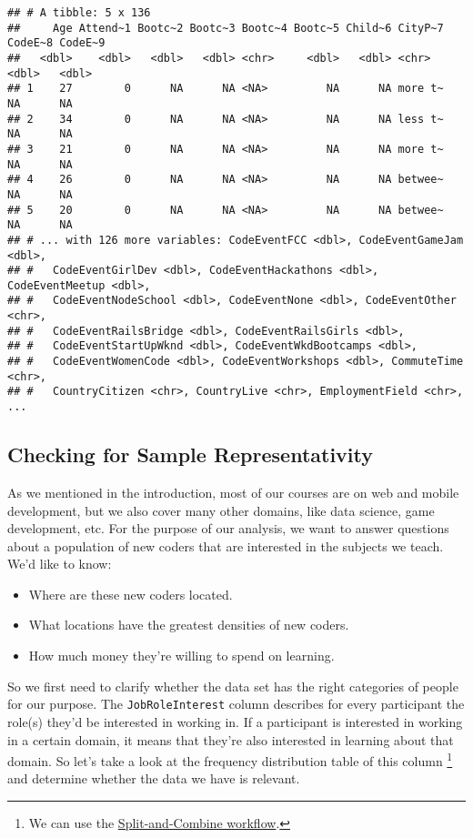 \documentclass[
]{article}
\providecommand{\tightlist}{%
  \setlength{\itemsep}{0pt}\setlength{\parskip}{0pt}}
\begin{document}
\begin{verbatim}
## # A tibble: 5 x 136
##     Age Attend~1 Bootc~2 Bootc~3 Bootc~4 Bootc~5 Child~6 CityP~7 CodeE~8 CodeE~9
##   <dbl>    <dbl>   <dbl>   <dbl> <chr>     <dbl>   <dbl> <chr>     <dbl>   <dbl>
## 1    27        0      NA      NA <NA>         NA      NA more t~      NA      NA
## 2    34        0      NA      NA <NA>         NA      NA less t~      NA      NA
## 3    21        0      NA      NA <NA>         NA      NA more t~      NA      NA
## 4    26        0      NA      NA <NA>         NA      NA betwee~      NA      NA
## 5    20        0      NA      NA <NA>         NA      NA betwee~      NA      NA
## # ... with 126 more variables: CodeEventFCC <dbl>, CodeEventGameJam <dbl>,
## #   CodeEventGirlDev <dbl>, CodeEventHackathons <dbl>, CodeEventMeetup <dbl>,
## #   CodeEventNodeSchool <dbl>, CodeEventNone <dbl>, CodeEventOther <chr>,
## #   CodeEventRailsBridge <dbl>, CodeEventRailsGirls <dbl>,
## #   CodeEventStartUpWknd <dbl>, CodeEventWkdBootcamps <dbl>,
## #   CodeEventWomenCode <dbl>, CodeEventWorkshops <dbl>, CommuteTime <chr>,
## #   CountryCitizen <chr>, CountryLive <chr>, EmploymentField <chr>, ...
\end{verbatim}

\hypertarget{checking-for-sample-representativity}{%
\subsection{Checking for Sample
Representativity}\label{checking-for-sample-representativity}}

As we mentioned in the introduction, most of our courses are on web and
mobile development, but we also cover many other domains, like data
science, game development, etc. For the purpose of our analysis, we want
to answer questions about a population of new coders that are interested
in the subjects we teach. We'd like to know:

\begin{itemize}
\tightlist
\item
  Where are these new coders located.
\item
  What locations have the greatest densities of new coders.
\item
  How much money they're willing to spend on learning.
\end{itemize}

So we first need to clarify whether the data set has the right
categories of people for our purpose. The \texttt{JobRoleInterest}
column describes for every participant the role(s) they'd be interested
in working in. If a participant is interested in working in a certain
domain, it means that they're also interested in learning about that
domain. So let's take a look at the frequency distribution table of this
column \footnote{We can use the
  \href{https://jofrhwld.github.io/teaching/courses/2017_lsa/lectures/Session_3.nb.html}{Split-and-Combine
  workflow}.} and determine whether the data we have is relevant.
\end{document}
